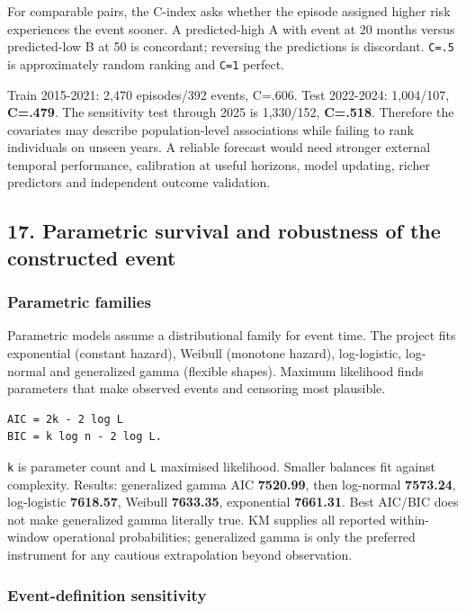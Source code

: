 For comparable pairs, the C-index asks whether the episode assigned
higher risk experiences the event sooner. A predicted-high A with event
at 20 months versus predicted-low B at 50 is concordant; reversing the
predictions is discordant. \texttt{C=.5} is approximately random ranking
and \texttt{C=1} perfect.

Train 2015-2021: 2,470 episodes/392 events, C=.606. Test 2022-2024:
1,004/107, \textbf{C=.479}. The sensitivity test through 2025 is
1,330/152, \textbf{C=.518}. Therefore the covariates may describe
population-level associations while failing to rank individuals on
unseen years. A reliable forecast would need stronger external temporal
performance, calibration at useful horizons, model updating, richer
predictors and independent outcome validation.

\subsection{17. Parametric survival and robustness of the constructed
event}\label{17-parametric-survival-and-robustness-of-the-constructed-event}

\subsubsection{Parametric families}\label{parametric-families}

Parametric models assume a distributional family for event time. The
project fits exponential (constant hazard), Weibull (monotone hazard),
log-logistic, log-normal and generalized gamma (flexible shapes).
Maximum likelihood finds parameters that make observed events and
censoring most plausible.

\begin{verbatim}
AIC = 2k - 2 log L
BIC = k log n - 2 log L.
\end{verbatim}

\texttt{k} is parameter count and \texttt{L} maximised likelihood.
Smaller balances fit against complexity. Results: generalized gamma AIC
\textbf{7520.99}, then log-normal \textbf{7573.24}, log-logistic
\textbf{7618.57}, Weibull \textbf{7633.35}, exponential
\textbf{7661.31}. Best AIC/BIC does not make generalized gamma literally
true. KM supplies all reported within-window operational probabilities;
generalized gamma is only the preferred instrument for any cautious
extrapolation beyond observation.

\subsubsection{Event-definition
sensitivity}\label{event-definition-sensitivity}

